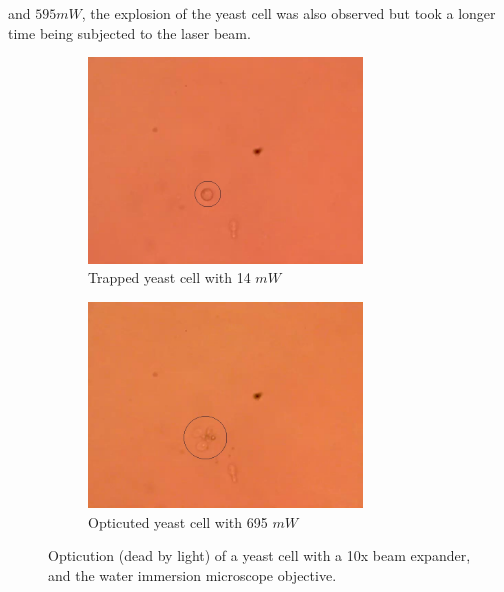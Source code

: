 \documentclass[letterpaper,12pt,oneside]{book}
\begin{document}
and $595 mW$, the explosion of the yeast cell was also observed but took a longer time being subjected to the laser beam. 
\begin{figure}[H]
     \centering
     \begin{subfigure}[b]{0.49\textwidth}
         \centering
         \includegraphics[width=0.80\textwidth]{Imagenes teoria/opticution0_edited.jpeg}
         \caption{Trapped yeast cell with 14 $mW$}
         \label{fig:y equals x}
     \end{subfigure}
     \hfill
     \begin{subfigure}[b]{0.49\textwidth}
         \centering
         \includegraphics[width=0.80\textwidth]{Imagenes teoria/opticution1_edited.jpeg}
         \caption{Opticuted yeast cell with 695 $mW$}
         \label{fig:three sin x}
     \end{subfigure}
     
     \caption{Opticution (dead by light) of a yeast cell with a 10x beam expander, and the water immersion microscope objective.}
     \label{opticution}
     \hfill
\end{figure}
\noindent
\end{document}
